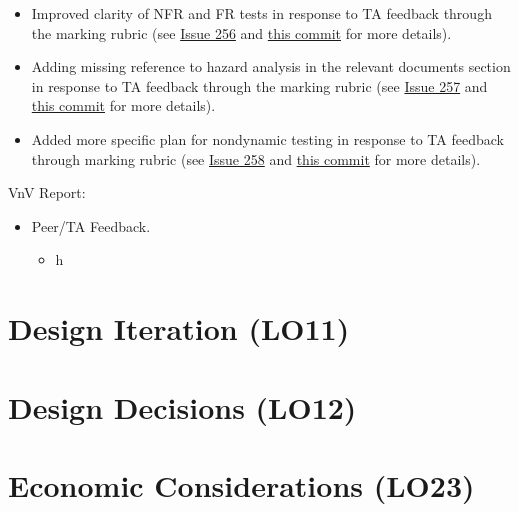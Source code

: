 \documentclass{article}
\begin{document}
\begin{itemize}
\begin{itemize}
		\item Improved clarity of NFR and FR tests in response to TA feedback through the marking rubric (see \href{https://github.com/davimang/REACH/issues/256}{Issue 256} and \href{https://github.com/davimang/REACH/commit/ce52fb62cb65dd884ee3c7afac4c7a684d84b771}{this commit} for more details).
		\item Adding missing reference to hazard analysis in the relevant documents section in response to TA feedback through the marking rubric (see \href{https://github.com/davimang/REACH/issues/257}{Issue 257} and \href{https://github.com/davimang/REACH/commit/396e5df0a6208758a45054c8e35b35d37d1cc25f}{this commit} for more details).
		\item Added more specific plan for nondynamic testing in response to TA feedback through marking rubric (see \href{https://github.com/davimang/REACH/issues/258}{Issue 258} and \href{https://github.com/davimang/REACH/commit/3a46bc35ff31855f752df09efb5f4dd5fa4211c7}{this commit} for more details).
	\end{itemize}
\end{itemize}

VnV Report:
\begin{itemize}
	\item Peer/TA Feedback.
	\begin{itemize}
		\item h
	\end{itemize}
\end{itemize}


\section{Design Iteration (LO11)}


\section{Design Decisions (LO12)}


\section{Economic Considerations (LO23)}
\end{document}
